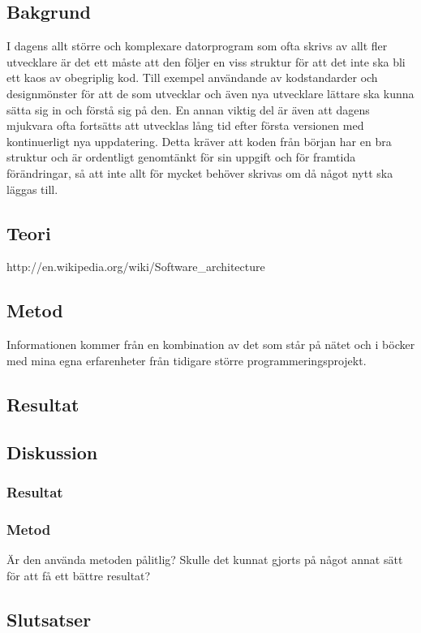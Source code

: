 \subsection{Bakgrund}
I dagens allt större och komplexare datorprogram som ofta skrivs av allt fler utvecklare är det ett måste att den följer en viss struktur för att det inte ska bli ett kaos av obegriplig kod. Till exempel användande av kodstandarder och designmönster för att de som utvecklar och även nya utvecklare lättare ska kunna sätta sig in och förstå sig på den.
\newline
\newline
En annan viktig del är även att dagens mjukvara ofta fortsätts att utvecklas lång tid efter första versionen med kontinuerligt nya uppdatering. Detta kräver att koden från början har en bra struktur och är ordentligt genomtänkt för sin uppgift och för framtida förändringar, så att inte allt för mycket behöver skrivas om då något nytt ska läggas till.
\subsection{Teori}
http://en.wikipedia.org/wiki/Software\_architecture
\subsection{Metod}
Informationen kommer från en kombination av det som står på nätet och i böcker med mina egna erfarenheter från tidigare större programmeringsprojekt.
\subsection{Resultat}
\subsection{Diskussion}
\subsubsection{Resultat}
\subsubsection{Metod}
Är den använda metoden pålitlig? Skulle det kunnat gjorts på något annat sätt för att få ett bättre resultat?
\subsection{Slutsatser}
